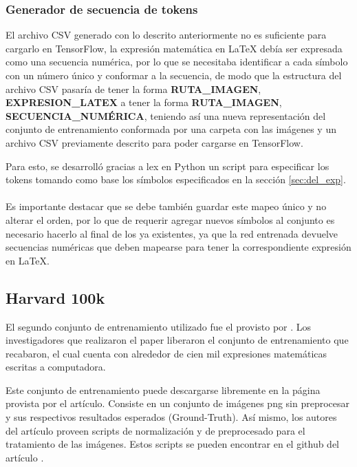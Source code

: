 \subsubsection{Generador de secuencia de tokens}
El archivo CSV generado con lo descrito anteriormente no es suficiente para cargarlo en TensorFlow, la expresión matemática en \LaTeX{} debía ser expresada como una secuencia numérica, por lo que se necesitaba identificar a cada símbolo con un número único y conformar a la secuencia, de modo que la estructura del archivo CSV pasaría de tener la forma \textbf{RUTA\_IMAGEN}, \textbf{EXPRESION\_LATEX} a tener la forma \textbf{RUTA\_IMAGEN}, \textbf{SECUENCIA\_NUMÉRICA}, teniendo así una nueva representación del conjunto de entrenamiento conformada por una carpeta con las imágenes y un archivo CSV previamente descrito para poder cargarse en TensorFlow.

Para esto, se desarrolló gracias a lex en Python un script para especificar los tokens tomando como base los símbolos especificados en la sección \ref{sec:del_exp}.\\\\






\vspace{1em}
Es importante destacar que se debe también guardar este mapeo único y no alterar el orden, por lo que de requerir agregar nuevos símbolos al conjunto es necesario hacerlo al final de los ya existentes, ya que la red entrenada devuelve secuencias numéricas que deben mapearse para tener la correspondiente expresión en \LaTeX{}.

\subsection{Harvard 100k}

El segundo conjunto de entrenamiento utilizado fue el provisto por \cite{harvard}. Los investigadores que realizaron el paper liberaron el conjunto de entrenamiento que recabaron, el cual cuenta con alrededor de cien mil expresiones matemáticas escritas a computadora.

Este conjunto de entrenamiento puede descargarse libremente en la página provista por el artículo. Consiste en un conjunto de imágenes png sin preprocesar y sus respectivos resultados esperados (Ground-Truth). Así mismo, los autores del artículo proveen scripts de normalización y de preprocesado para el tratamiento de las imágenes. Estos scripts se pueden encontrar en el github del artículo \cite{harvard-scripts}.

